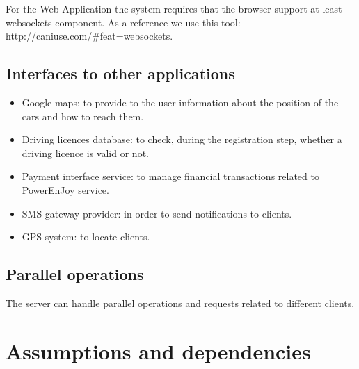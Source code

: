 For the Web Application the system requires that the browser support at least websockets component. As a reference we use this tool:  http://caniuse.com/\#feat=websockets.

\subsection{Interfaces to other applications}
\begin{itemize}
\item Google maps: to provide to the user information about the position of the cars and how to reach them.
\item Driving licences database: to check, during the registration step, whether a driving licence is valid or not.
\item Payment interface service: to manage financial transactions related to PowerEnJoy service.
\item SMS gateway provider: in order to send notifications to clients.
\item GPS system: to locate clients.
\end{itemize}

\subsection{Parallel operations}
The server can handle parallel operations and requests related to different clients.

\section{Assumptions and dependencies}

